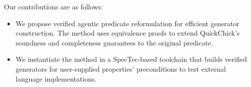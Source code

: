 
Our contributions are as follows:
\begin{itemize}
  \item We propose verified agentic predicate reformulation for efficient
    generator construction. The method uses equivalence proofs to extend
    QuickChick's soundness and completeness guarantees to the original predicate.
  \item We instantiate the method in a SpecTec-based toolchain that builds
    verified generators for user-supplied properties' preconditions to test
    external language implementations.
\end{itemize}
